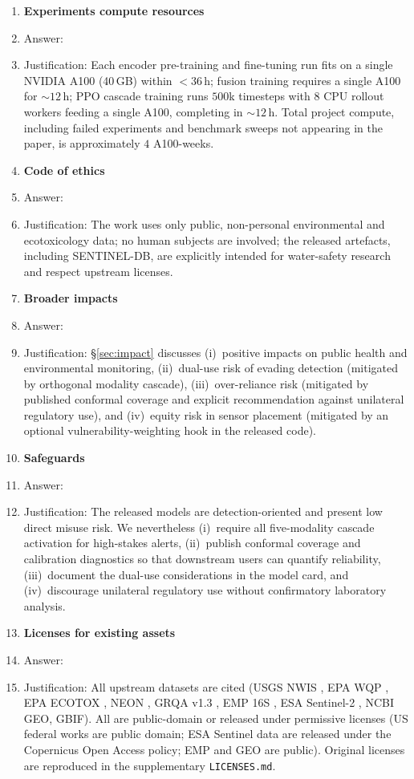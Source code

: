 \begin{enumerate}
\item {\bf Experiments compute resources}
    \item[] Answer: \answerYes{}
    \item[] Justification: Each encoder pre-training and fine-tuning run fits on a single NVIDIA A100 (40\,GB) within $<\!36$\,h; fusion training requires a single A100 for $\sim\!12$\,h; PPO cascade training runs $500$k timesteps with $8$ CPU rollout workers feeding a single A100, completing in $\sim\!12$\,h. Total project compute, including failed experiments and benchmark sweeps not appearing in the paper, is approximately $4$ A100-weeks.

\item {\bf Code of ethics}
    \item[] Answer: \answerYes{}
    \item[] Justification: The work uses only public, non-personal environmental and ecotoxicology data; no human subjects are involved; the released artefacts, including SENTINEL-DB, are explicitly intended for water-safety research and respect upstream licenses.

\item {\bf Broader impacts}
    \item[] Answer: \answerYes{}
    \item[] Justification: \S\ref{sec:impact} discusses (i)~positive impacts on public health and environmental monitoring, (ii)~dual-use risk of evading detection (mitigated by orthogonal modality cascade), (iii)~over-reliance risk (mitigated by published conformal coverage and explicit recommendation against unilateral regulatory use), and (iv)~equity risk in sensor placement (mitigated by an optional vulnerability-weighting hook in the released code).

\item {\bf Safeguards}
    \item[] Answer: \answerYes{}
    \item[] Justification: The released models are detection-oriented and present low direct misuse risk. We nevertheless (i)~require all five-modality cascade activation for high-stakes alerts, (ii)~publish conformal coverage and calibration diagnostics so that downstream users can quantify reliability, (iii)~document the dual-use considerations in the model card, and (iv)~discourage unilateral regulatory use without confirmatory laboratory analysis.

\item {\bf Licenses for existing assets}
    \item[] Answer: \answerYes{}
    \item[] Justification: All upstream datasets are cited (USGS NWIS \citep{usgs_nwis}, EPA WQP \citep{epa_wqp}, EPA ECOTOX \citep{epa_ecotox}, NEON \citep{neon}, GRQA v1.3 \citep{virro2021grqa}, EMP 16S \citep{thompson2017earthmicrobiome}, ESA Sentinel-2 \citep{drusch2012sentinel2}, NCBI GEO, GBIF). All are public-domain or released under permissive licenses (US federal works are public domain; ESA Sentinel data are released under the Copernicus Open Access policy; EMP and GEO are public). Original licenses are reproduced in the supplementary \texttt{LICENSES.md}.


\end{enumerate}
